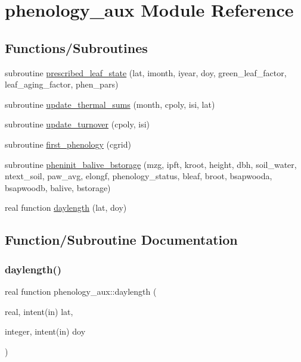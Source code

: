 \hypertarget{namespacephenology__aux}{}\section{phenology\+\_\+aux Module Reference}
\label{namespacephenology__aux}
\subsection*{Functions/\+Subroutines}
\begin{DoxyCompactItemize}
\item 
subroutine \hyperlink{namespacephenology__aux_aac80b26fc41e788ad7669441222543ff}{prescribed\+\_\+leaf\+\_\+state} (lat, imonth, iyear, doy, green\+\_\+leaf\+\_\+factor, leaf\+\_\+aging\+\_\+factor, phen\+\_\+pars)
\item 
subroutine \hyperlink{namespacephenology__aux_a227cf46507f7976ea4dd53e724e157c0}{update\+\_\+thermal\+\_\+sums} (month, cpoly, isi, lat)
\item 
subroutine \hyperlink{namespacephenology__aux_a7a199ed988a720b2e56c3b5e1407995a}{update\+\_\+turnover} (cpoly, isi)
\item 
subroutine \hyperlink{namespacephenology__aux_ac9c11ddf83cd16439262bc9c7c72bf2e}{first\+\_\+phenology} (cgrid)
\item 
subroutine \hyperlink{namespacephenology__aux_ac99e8cfcfd964b2feceda6835f18a4e2}{pheninit\+\_\+balive\+\_\+bstorage} (mzg, ipft, kroot, height, dbh, soil\+\_\+water, ntext\+\_\+soil, paw\+\_\+avg, elongf, phenology\+\_\+status, bleaf, broot, bsapwooda, bsapwoodb, balive, bstorage)
\item 
real function \hyperlink{namespacephenology__aux_a6fd36340ae7c75f11750adbf09d700d9}{daylength} (lat, doy)
\end{DoxyCompactItemize}


\subsection{Function/\+Subroutine Documentation}
\mbox{\label{namespacephenology__aux_a6fd36340ae7c75f11750adbf09d700d9}} 
\subsubsection{\texorpdfstring{daylength()}{daylength()}}
{\footnotesize\ttfamily real function phenology\+\_\+aux\+::daylength (\begin{DoxyParamCaption}\item[{real, intent(in)}]{lat,  }\item[{integer, intent(in)}]{doy }\end{DoxyParamCaption})}

